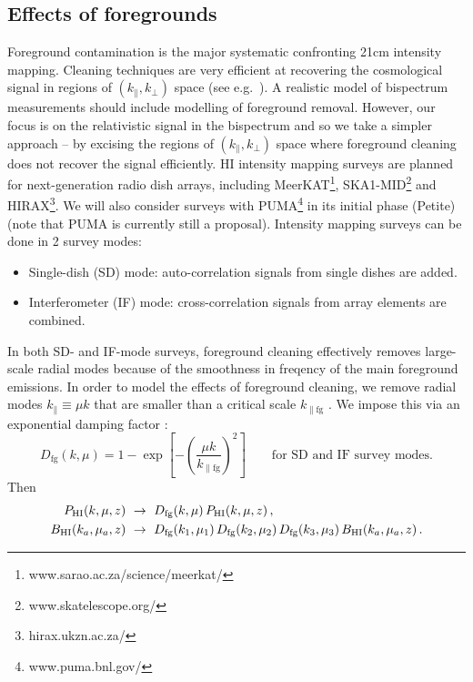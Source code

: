 \subsection{Effects of foregrounds}
%
Foreground contamination is the major systematic confronting 21cm intensity mapping. 
Cleaning techniques are very efficient at recovering the cosmological signal in regions of $(k_\|,k_\perp)$ space (see e.g.~\cite{Pober:2013jna, Bull:2014rha, Alonso:2014dhk, Pober:2014lva, Wolz:2015sqa, Santos:2015gra, Shaw:2014khi, Obuljen:2017jiy, Ansari:2018ury, Witzemann:2018cdx, Bacon:2018dui, Asorey:2020mxs, Cunnington:2020mnn}). A realistic model of bispectrum measurements should include modelling of foreground removal. However, our focus is on the relativistic signal in the bispectrum and so we take a simpler approach -- by excising the regions of $(k_\|,k_\perp)$ space where foreground cleaning does not recover  the signal efficiently.
%
HI intensity mapping surveys are planned for next-generation radio dish arrays, including MeerKAT\footnote{www.sarao.ac.za/science/meerkat/}, SKA1-MID\footnote{{www.skatelescope.org/}} and HIRAX\footnote{hirax.ukzn.ac.za/}. We will also consider surveys with
PUMA\footnote{{www.puma.bnl.gov/}}  in its initial phase (Petite) (note that PUMA is currently still a proposal).
Intensity mapping surveys can be done in 2 survey modes:
\begin{itemize}
\item Single-dish (SD) mode: auto-correlation signals from single dishes are added.
\item Interferometer (IF) mode: cross-correlation signals from array elements are combined. 
\end{itemize}  
In both SD- and IF-mode surveys, foreground cleaning effectively removes large-scale radial modes {because of the smoothness in freqency of the main foreground emissions}. In order to model the effects of foreground cleaning, we remove radial modes $k_\| \equiv \mu k$ that are smaller than a critical scale $k_{\| \mathrm{fg}}$  \cite{Karagiannis:2018jdt}.
We impose this via an exponential damping factor \cite{Bull:2014rha}:  
\begin{equation}\label{eq:e2.21}
D_{\mathrm{fg}}(k,\mu)= 1-\exp\left[-\left(\frac{\mu k}{k_{\| \mathrm{fg}}}\right)^2\right]\qquad \mbox{for SD and IF survey modes.}
\end{equation}
Then 
\begin{align}
P_{{\mathrm{HI}}}(k,\mu,z)  &~\to~ D_{\mathrm{fg}} (k,\mu)\,P_{{\mathrm{HI}}}(k,\mu,z) \,,\\
B_{{\mathrm{HI}}}(k_a,\mu_a,z) & ~\to~ D_{\mathrm{fg}} (k_1,\mu_1)\,D_{\mathrm{fg}} (k_2,\mu_2)\,D_{\mathrm{fg}} (k_3,\mu_3)\,B_{{\mathrm{HI}}}(k_a,\mu_a,z)\,.
\end{align}
